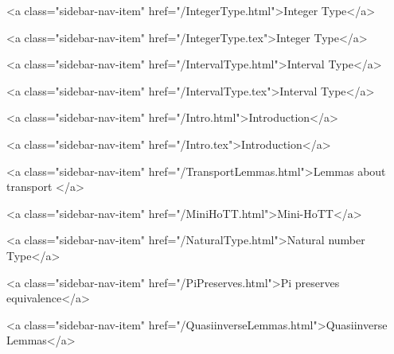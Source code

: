       
    
      
        
          <a class="sidebar-nav-item" href="/IntegerType.html">Integer Type</a>
        
      
    
      
        
          <a class="sidebar-nav-item" href="/IntegerType.tex">Integer Type</a>
        
      
    
      
        
          <a class="sidebar-nav-item" href="/IntervalType.html">Interval Type</a>
        
      
    
      
        
          <a class="sidebar-nav-item" href="/IntervalType.tex">Interval Type</a>
        
      
    
      
        
          <a class="sidebar-nav-item" href="/Intro.html">Introduction</a>
        
      
    
      
        
          <a class="sidebar-nav-item" href="/Intro.tex">Introduction</a>
        
      
    
      
        
          <a class="sidebar-nav-item" href="/TransportLemmas.html">Lemmas about transport </a>
        
      
    
      
        
          <a class="sidebar-nav-item" href="/MiniHoTT.html">Mini-HoTT</a>
        
      
    
      
        
          <a class="sidebar-nav-item" href="/NaturalType.html">Natural number Type</a>
        
      
    
      
        
          <a class="sidebar-nav-item" href="/PiPreserves.html">Pi preserves equivalence</a>
        
      
    
      
        
          <a class="sidebar-nav-item" href="/QuasiinverseLemmas.html">Quasiinverse Lemmas</a>
        

